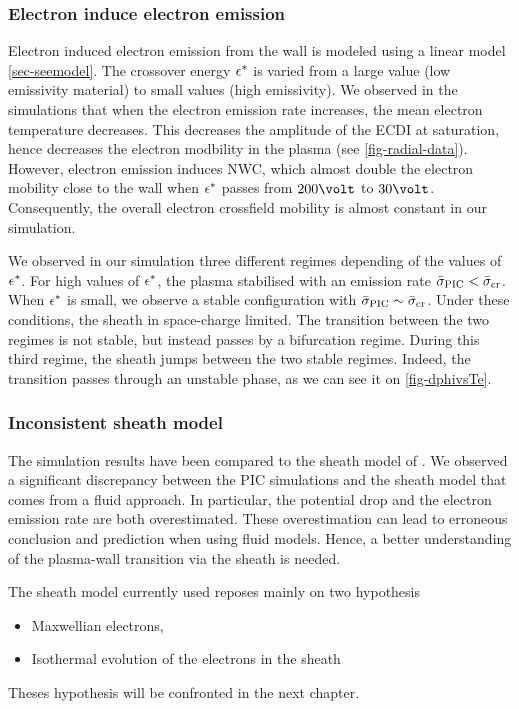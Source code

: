   
  \subsubsection*{Electron induce electron emission}
  
  Electron induced electron emission from the wall is modeled using a linear model \vref{sec-seemodel}.
  The crossover energy $\epsilon^{*}$ is varied from a large value (low emissivity material) to small values (high emissivity).
  We observed in the simulations that when the electron emission rate increases, the mean electron temperature decreases.
  This decreases the amplitude of the \ac{ECDI} at saturation, hence decreases the electron modbility in the plasma (see \vref{fig-radial-data}).
  However, electron emission induces \ac{NWC}, which almost double the electron mobility close to the wall when $\epsilon^{*}$ passes from $200\volt$ to $30\volt$.
  Consequently, the overall electron crossfield mobility is almost constant in our simulation.
  
  We observed in our simulation three different regimes depending of the values of $\epsilon^{*}$.
  For high values of $\epsilon^{*}$, the plasma stabilised with an emission rate $ \bar{\sigma }_{\rm PIC} <  \bar{\sigma }_{\rm cr}$.
  When $\epsilon^{*}$ is small, we observe a stable configuration with $ \bar{\sigma }_{\rm PIC} \sim  \bar{\sigma }_{\rm cr}$.
  Under these conditions, the sheath in space-charge limited.
  The transition between the two regimes is not stable, but instead passes by a bifurcation regime.
  During this third regime, the sheath jumps between the two stable regimes.
  Indeed, the transition passes through an unstable phase, as we can see it on \vref{fig-dphivsTe}.
  

  \subsubsection*{Inconsistent sheath model }
  
  The simulation results have been compared to the sheath model of \citet{hobbs1967}.
  We observed a significant discrepancy between the \ac{PIC} simulations and the sheath model that comes from a fluid approach.
  In particular, the potential drop and the electron emission rate are both overestimated.
  These overestimation can lead to erroneous conclusion and prediction when using fluid models.
  Hence, a better understanding of the plasma-wall transition via the sheath is needed.
  
  The sheath model currently used reposes mainly on two hypothesis
  \begin{itemize}
    \item Maxwellian electrons,
    \item Isothermal evolution of the electrons in the sheath
  \end{itemize}
  
  Theses hypothesis will be confronted in the next chapter.
  